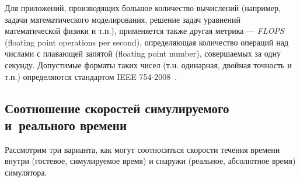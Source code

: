 Для приложений, производящих большое количество вычислений (например, задачи математического моделирования, решение задач уравнений математической физики и т.п.), применяется также другая метрика --- \textit{FLOPS} (\abbr floating point operations per second), определяющая количество операций над числами с плавающей запятой (\abbr floating point number), совершаемых за одну секунду. Допустимые форматы таких чисел (т.н. одинарная, двойная точность и т.п.) определяются стандартом IEEE 754-2008~\cite{ieee754}.

\subsection[Соотношение скоростей]{Соотношение скоростей симулируемого и~реального времени}

Рассмотрим три варианта, как могут соотноситься скорости течения времени внутри (гостевое, симулируемое время) и снаружи (реальное, абсолютное время) симулятора.

